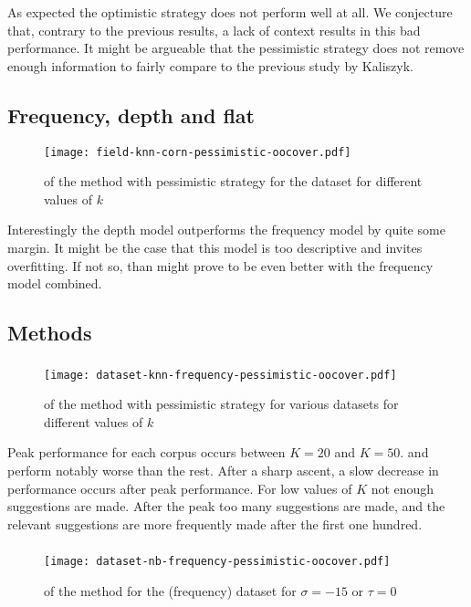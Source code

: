 As expected the optimistic strategy does not perform well at all.
We conjecture that, contrary to the previous results, a lack of context results in this bad performance.
It might be argueable that the pessimistic strategy does not remove enough information to fairly compare to the previous study by
Kaliszyk. \cite{kaliszyk2014machine}

\subsection{Frequency, depth and flat}
\begin{figure}[H]
  \centering
  \texttt{[image: field-knn-corn-pessimistic-oocover.pdf]}
  \caption{\oocover of the \knn method with pessimistic strategy for the \corn dataset for different values of $k$}
\end{figure}

Interestingly the depth model outperforms the frequency model by quite some margin.
It might be the case that this model is too descriptive and invites overfitting.
If not so, than might prove to be even better with the frequency model combined.

\subsection{Methods}

\subsubsection{\knn}
\begin{figure}[H]
  \centering
  \texttt{[image: dataset-knn-frequency-pessimistic-oocover.pdf]}
  \caption{\oocover of the \knn method with pessimistic strategy for various datasets for different values of $k$}
\end{figure}

Peak \oocover performance for each corpus occurs between $K=20$ and $K=50$.
\corn and \mathclasses perform notably worse than the rest.
After a sharp ascent, a slow decrease in performance occurs after peak performance.
For low values of $K$ not enough suggestions are made.
After the peak too many suggestions are made, and the relevant suggestions are more frequently made after the first one hundred.

\subsubsection{\nb}
\begin{figure}[H]
  \centering
  \texttt{[image: dataset-nb-frequency-pessimistic-oocover.pdf]}
  \caption{\oocover of the \nb method for the \corn (frequency) dataset for $\sigma = -15$ or $\tau = 0$}
\end{figure}


